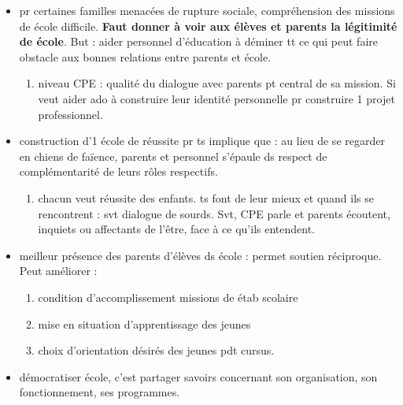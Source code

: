 \documentclass[12pt]{report}
\begin{document}
\begin{itemize}
\item pr certaines familles menacées de rupture sociale, compréhension des missions de école difficile. \textbf{Faut donner à voir aux élèves et parents la légitimité de école}. But : aider personnel d'éducation à déminer tt ce qui peut faire obstacle aux bonnes relations entre parents et école.\\
\begin{enumerate}
\item niveau CPE : qualité du dialogue avec parents pt central de sa mission. Si veut aider ado à construire leur identité personnelle pr construire 1 projet professionnel.\\
\end{enumerate}

\item construction d'1 école de réussite pr ts implique que : au lieu de se regarder en chiens de faïence, parents et personnel s'épaule ds respect de complémentarité de leurs rôles respectifs.\\ 
\begin{enumerate}
\item chacun veut réussite des enfants. ts font de leur mieux et quand ils se rencontrent : svt dialogue de sourds. Svt, CPE parle et parents écoutent, inquiets ou affectants de l'être, face à ce qu'ils entendent.\\
 \end{enumerate}

\item meilleur présence des parents d'élèves ds école : permet soutien réciproque. Peut améliorer : 
\begin{enumerate}
\item condition d'accomplissement missions de étab scolaire \\
\item mise en situation d'apprentissage des jeunes \\
\item choix d'orientation désirés des jeunes pdt cursus. \\
\end{enumerate}

\item démocratiser école, c'est partager savoirs concernant son organisation, son fonctionnement, ses programmes.\\


\end{itemize}
\end{document}
